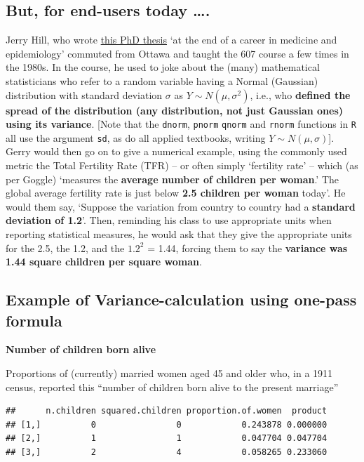 \documentclass[]{book}
\begin{document}
\hypertarget{but-for-end-users-today-.}{%
\subsection{But, for end-users today \ldots{}.}\label{but-for-end-users-today-.}}

Jerry Hill, who wrote
\href{https://www.collectionscanada.gc.ca/obj/s4/f2/dsk2/ftp02/NQ26855.pdf}{this PhD thesis} `at the end of a career in medicine and epidemiology' commuted from Ottawa and taught the 607 course a few times in the 1980s. In the course, he used to joke about the (many) mathematical statisticians who refer to a random variable having a Normal (Gaussian) distribution with standard deviation \(\sigma\) as \(Y \sim N(\mu, \sigma^2)\), i.e., who \textbf{defined the spread of the distribution (any distribution, not just Gaussian ones) using its variance}. {[}Note that the \texttt{dnorm}, \texttt{pnorm} \texttt{qnorm} and \texttt{rnorm} functions in \texttt{R} all use the argument \texttt{sd}, as do all applied textbooks, writing \(Y \sim N(\mu, \sigma)\){]}. Gerry would then go on to give a numerical example, using the commonly used metric the Total Fertility Rate (TFR) -- or often simply `fertility rate' -- which (as per Goggle) `measures the \textbf{average number of children per woman}.' The global average fertility rate is just below \textbf{2.5 children per woman} today'. He would them say, `Suppose the variation from country to country had a \textbf{standard deviation of 1.2}'. Then, reminding his class to use appropriate units when reporting statistical measures, he would ask that they give the appropriate units for the 2.5, the 1.2, and the \(1.2^2\) = 1.44, forcing them to say the \textbf{variance was 1.44 square children per square woman}.

\hypertarget{example-of-variance-calculation-using-one-pass-formula}{%
\subsection{Example of Variance-calculation using one-pass formula}\label{example-of-variance-calculation-using-one-pass-formula}}

\textbf{Number of children born alive}

Proportions of (currently) married women aged 45 and older who, in a 1911 census, reported this ``number of children born alive to the present marriage''

\begin{verbatim}
##      n.children squared.children proportion.of.women  product
## [1,]          0                0            0.243878 0.000000
## [2,]          1                1            0.047704 0.047704
## [3,]          2                4            0.058265 0.233060
\end{verbatim}
\end{document}
